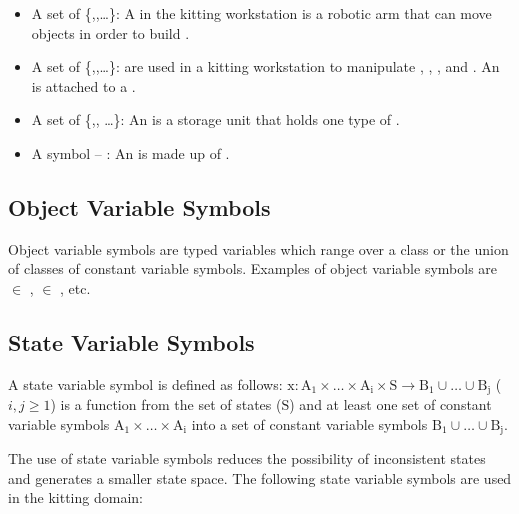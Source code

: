 \begin{itemize}
\item A set of  \{,,\ldots\}: A  in the kitting workstation is a robotic arm that can move objects in order to build .

\item A set of  \{,,\ldots\}:  are used in a kitting workstation to manipulate , , , and . An  is attached to a .

\item A set of   \{,, \ldots\}: An  is a storage unit that holds one type of .

\item A symbol  -- : An  is made up of .
\end{itemize}

\subsection{Object Variable Symbols}
Object variable symbols are typed variables which range over a class or the union of classes of constant variable symbols. Examples of object variable symbols are  $\in$ ,  $\in$ , etc.

\subsection{State Variable Symbols}
\label{subsubsect:State_Variable_Symbols}
A state variable symbol is defined as follows:
$\mathrm{x: A_1\times \dots\times A_i\times S\rightarrow B_1\cup\dots\cup B_j}$ ($i, j\geq 1$) is a function from the set of states ($\mathrm{S}$) and at least one set of constant variable symbols $\mathrm{A_1\times \dots\times A_i}$ into a set of constant variable symbols $\mathrm{B_1\cup\dots\cup B_j}$.

The use of state variable symbols reduces the possibility of inconsistent states and generates a smaller state space. The following state variable symbols are used in the kitting domain:

